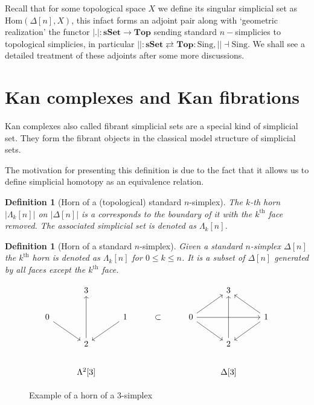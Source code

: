 \documentclass[12pt]{report}
\numberwithin{equation}{section}
\newcommand{\Hom}{{\mathrm{Hom}}}
\newtheorem{definition}[dummy]{Definition}
\begin{document}
	

	Recall that for some topological space $X$ we define its singular simplicial set as $\Hom(\Delta[n],X)$, this infact forms an adjoint pair along with `geometric realization' the functor  $|.|: \mathbf{sSet} \to \mathbf{Top}$ sending standard $n-$simplicies to topological simplicies, in particular $||:\mathbf{sSet} \rightleftarrows \mathbf{Top}: \mathrm{Sing}, || \dashv \mathrm{Sing}$. We shall see a detailed treatment of these adjoints after some more discussions.
	

	\section{Kan complexes and Kan fibrations}
	Kan complexes also called fibrant simplicial sets are a special kind of simplicial set. They form the fibrant objects in the classical model structure of simplicial sets.
	
	The motivation for presenting this definition is due to the fact that it allows us to define simplicial homotopy as an equivalence relation. 
	
	\begin{definition}[Horn of a (topological) standard $n$-simplex]
		The $k$-th horn $|\Lambda_k[n]|$ on $|\Delta[n]|$ is a corresponds to the boundary of it with the $k^{\mathrm{th}}$ face removed. The associated simplicial set is denoted as $\Lambda_k[n]$.
	\end{definition}
	
	\begin{definition}[Horn of a standard $n$-simplex]
		Given a standard $n$-simplex $\Delta[n]$ the $k^\text{th}$ horn is denoted as $\Lambda_k[n]$ for $0 \leq k \leq n$. It is a subset of $\Delta[n]$ generated by all faces except the $k^\text{th}$ face.
	\end{definition}
	
	
		\begin{figure}[!htb]
		\centering
		\[\begin{tikzcd}
		& 3 &&&& 3 \\
		0 && 1 & \subset & 0 && 1 \\
		& 2 &&&& 2 \\
		& {\Lambda^2[3]} &&&& {\Delta[3]}
		\arrow[from=2-1, to=3-2]
		\arrow[from=2-3, to=3-2]
		\arrow[from=2-5, to=1-6]
		\arrow[from=2-5, to=2-7]
		\arrow[from=2-5, to=3-6]
		\arrow[from=2-7, to=1-6]
		\arrow[from=2-7, to=3-6]
		\arrow[from=3-2, to=1-2]
		\arrow[from=3-6, to=1-6]
		\end{tikzcd}\]
		\caption{Example of a horn of a $3$-simplex}
		\label{fig:horn}
	\end{figure}
	
\end{document}
